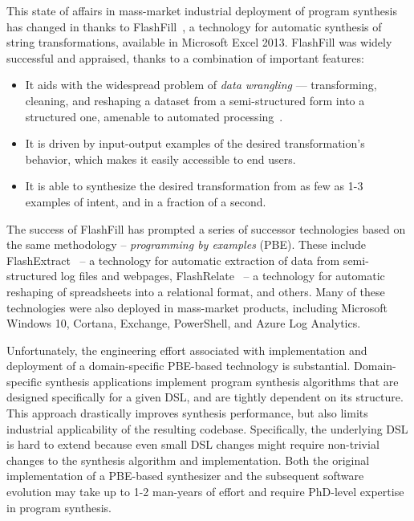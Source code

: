 This state of affairs in mass-market industrial deployment of program synthesis has changed in \citeyear{flashfill}
thanks to FlashFill~\cite{flashfill}, a technology for automatic synthesis of string
transformations, available in Microsoft Excel 2013.
FlashFill was widely successful and appraised, thanks to a combination of important features:
\begin{itemize}[nosep]
    \item It aids with the widespread problem of \emph{data wrangling} --- transforming, cleaning, and reshaping a
        dataset from a semi-structured form into a structured one, amenable to automated
        processing~\cite{kandel2012enterprise}.
    \item It is driven by input-output examples of the desired transformation's behavior, which makes it easily
        accessible to end users.
    \item It is able to synthesize the desired transformation from as few as 1-3 examples of intent, and in a fraction
        of a second.
\end{itemize}

The success of FlashFill has prompted a series of successor technologies based on the same methodology --
\emph{programming by examples} (PBE).
These include FlashExtract~\cite{flashextract} -- a technology for automatic extraction of data from semi-structured log
files and webpages, FlashRelate~\cite{flashrelate} -- a technology for automatic reshaping of spreadsheets into a
relational format, and others.
Many of these technologies were also deployed in mass-market products, including Microsoft Windows 10, Cortana,
Exchange, PowerShell, and Azure Log Analytics.

Unfortunately, the engineering effort associated with implementation and deployment of a domain-specific PBE-based
technology is substantial.
Domain-specific synthesis applications implement program synthesis algorithms that are designed specifically for a given
DSL, and are tightly dependent on its structure.
This approach drastically improves synthesis performance, but also limits industrial applicability of the resulting
codebase.
Specifically, the underlying DSL is hard to extend because even small DSL changes might require non-trivial changes
to the synthesis algorithm and implementation.
Both the original implementation of a PBE-based synthesizer and the subsequent software evolution may take up to 1-2
man-years of effort and require PhD-level expertise in program synthesis.

